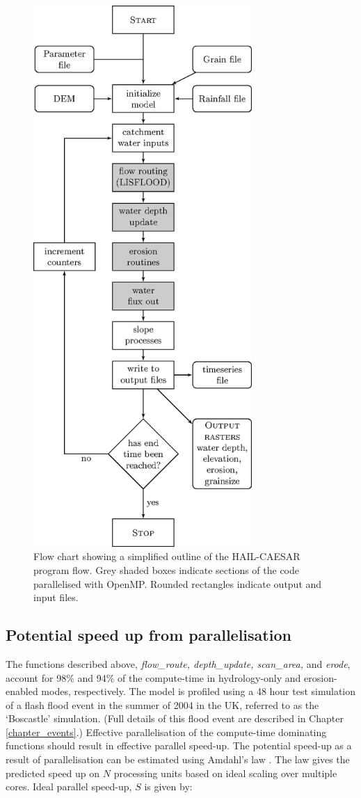 \begin{figure}[t]
\includegraphics[width=8.3cm]{chp05_figures_scripts/tikz.eps}
\caption{Flow chart showing a simplified outline of the HAIL-CAESAR program flow. Grey shaded boxes indicate sections of the code parallelised with OpenMP. Rounded rectangles indicate output and input files.}
\label{fig_flowchart}
\end{figure}

\subsection{Potential speed up from parallelisation}

The functions described above, \textit{flow\_route, depth\_update, scan\_area,} and \textit{erode}, account for 98\% and 94\% of the compute-time in hydrology-only and erosion-enabled modes, respectively. The model is profiled using a 48 hour test simulation of a flash flood event in the summer of 2004 in the UK, referred to as the `Boscastle' simulation. (Full details of this flood event are described in Chapter \ref{chapter_events}.) Effective parallelisation of the compute-time dominating functions should result in effective parallel speed-up. The potential speed-up as a result of parallelisation can be estimated using Amdahl's law \citep{amdahl1967validity}. The law gives the predicted speed up on \(N\) processing units based on ideal scaling over multiple cores. Ideal parallel speed-up, \(S\) is given by:

